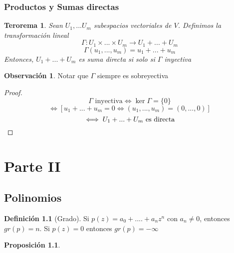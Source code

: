 \documentclass[11pt]{book}
\newtheorem{thm}{Terorema}[section]
\newtheorem{prop}[thm]{Proposición}
\theoremstyle{definition}
\newtheorem{defn}{Definición}[section]
\newtheorem{obs}{Observación}[section]
\begin{document}
\subsection{Productos y Sumas directas}
\begin{thm}
Sean $U_1,...U_m$ subespacios vectoriales de $V$. Definimos la transformación lineal
\[\Gamma:U_1\times...\times U_m\rightarrow U_1+...+U_m\]
\[\Gamma(u_1,...,u_m)=u_1+...+u_m\]
Entonces, $U_1+...+U_m$ es suma directa si solo si $\Gamma$ inyectiva
\end{thm}
\begin{obs}
Notar que $\Gamma$ siempre es sobreyectiva
\end{obs}
\begin{proof}
\[\Gamma\textrm{ inyectiva} \iff\ker\Gamma=\{0\}\]
\[\iff [u_1+...+u_m=0\iff(u_1,...,u_m)=(0,...,0)]\]
\[\iff U_1+...+U_m\textrm{ es directa}\qedhere\]
\end{proof}

\chapter{Parte II}
\section{Polinomios}
\begin{defn}[Grado]
Si $p(z)=a_0+....+a_nz^n$ con $a_n\neq 0$, entonces $gr(p)=n$. Si $p(z)=0$ entonces $gr(p)=-\infty$
\end{defn}
\begin{prop}

\end{prop}
\end{document}
